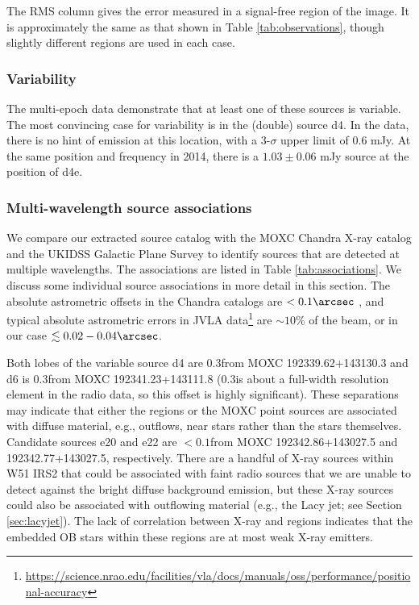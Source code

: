 The RMS column gives the error measured in a signal-free region of the image.
It is approximately the same as that shown in Table \ref{tab:observations},
though slightly different regions are used in each case.




\subsubsection{Variability}
\label{sec:variability}
The multi-epoch data demonstrate that at least one of these sources is
variable.  The most convincing case for variability is in the (double) source
d4.  In the \citet{Mehringer1994a} data, there is no
hint of emission at this location, with a 3-$\sigma$ upper limit of 0.6 mJy.
At the same position and frequency in 2014, there is a $1.03 \pm 0.06$ mJy
source at the position of d4e. 


\subsubsection{Multi-wavelength source associations}
\label{sec:associations}
We compare our extracted source catalog with the MOXC Chandra X-ray catalog
\citep{Townsley2014a} and the UKIDSS Galactic Plane Survey
\citep[UGPS;][]{Lucas2008a} to identify sources that are detected at multiple
wavelengths.  The associations are listed in Table
\ref{tab:associations}.  We discuss some
individual source associations in more detail in this section.
The absolute astrometric offsets in the Chandra catalogs are $<0.1\arcsec$
\citep{Townsley2014a}, and typical absolute astrometric errors in JVLA
data\footnote{\url{https://science.nrao.edu/facilities/vla/docs/manuals/oss/performance/positional-accuracy}}
are $\sim10\%$ of the beam, or in our case $\lesssim0.02-0.04\arcsec$.

Both lobes of the variable source d4 are
0.3\arcsec from MOXC 192339.62+143130.3 and d6 is 0.3\arcsec from MOXC
192341.23+143111.8 (0.3\arcsec is about a full-width resolution element in the
radio data, so this offset
is highly significant).    These
separations may indicate that either the \hii regions or the MOXC point sources
are associated with diffuse material, e.g., outflows,
near stars rather than the stars themselves.  
Candidate sources e20 and e22 are $<0.1$\arcsec from
MOXC 192342.86+143027.5 and 192342.77+143027.5, respectively.
There are a handful of X-ray
sources within W51 IRS2 that could be associated with faint radio sources that
we are unable to detect against the bright diffuse background emission, but
these X-ray sources could also be associated with
outflowing material (e.g., the Lacy jet; see Section \ref{sec:lacyjet}).  The
lack of correlation between X-ray and \hchii regions indicates that the
embedded OB stars within these \hchii regions are at most weak X-ray emitters.  

